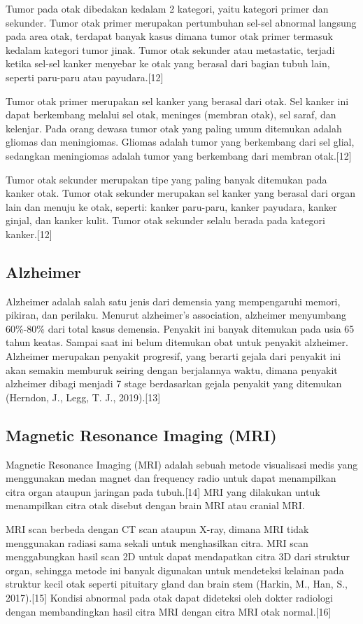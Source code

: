 Tumor pada otak dibedakan kedalam 2 kategori, yaitu kategori primer dan sekunder. Tumor otak primer merupakan pertumbuhan sel-sel abnormal langsung pada area otak, terdapat banyak kasus dimana tumor otak primer termasuk kedalam kategori tumor jinak. Tumor otak sekunder atau metastatic, terjadi ketika sel-sel kanker menyebar ke otak yang berasal dari bagian tubuh lain, seperti paru-paru atau payudara.[12]

Tumor otak primer merupakan sel kanker yang berasal dari otak. Sel kanker ini dapat berkembang melalui sel otak, meninges (membran otak), sel saraf, dan kelenjar. Pada orang dewasa tumor otak yang paling umum ditemukan adalah gliomas dan meningiomas. Gliomas adalah tumor yang berkembang dari sel glial, sedangkan meningiomas adalah tumor yang berkembang dari membran otak.[12]

Tumor otak sekunder merupakan tipe yang paling banyak ditemukan pada kanker otak. Tumor otak sekunder merupakan sel kanker yang berasal dari organ lain dan menuju ke otak, seperti: kanker paru-paru, kanker payudara, kanker ginjal, dan kanker kulit. Tumor otak sekunder selalu berada pada kategori kanker.[12]

\subsection{Alzheimer}
Alzheimer adalah salah satu jenis dari demensia yang mempengaruhi memori, pikiran, dan perilaku. Menurut alzheimer’s association, alzheimer menyumbang 60\%-80\% dari total kasus demensia. Penyakit ini banyak ditemukan pada usia 65 tahun keatas. Sampai saat ini belum ditemukan obat untuk penyakit alzheimer. Alzheimer merupakan penyakit progresif, yang berarti gejala dari penyakit ini akan semakin memburuk seiring dengan berjalannya waktu, dimana penyakit alzheimer dibagi menjadi 7 stage berdasarkan gejala penyakit yang ditemukan (Herndon, J., Legg, T. J., 2019).[13]

\subsection{Magnetic Resonance Imaging (MRI)}
Magnetic Resonance Imaging (MRI) adalah sebuah metode visualisasi medis yang menggunakan medan magnet dan frequency radio untuk dapat menampilkan citra organ ataupun jaringan pada tubuh.[14] MRI yang dilakukan untuk menampilkan citra otak disebut dengan brain MRI atau cranial MRI.

MRI scan berbeda dengan CT scan ataupun X-ray, dimana MRI tidak menggunakan radiasi sama sekali untuk menghasilkan citra. MRI scan menggabungkan hasil scan 2D untuk dapat mendapatkan citra 3D dari struktur organ, sehingga metode ini banyak digunakan untuk mendeteksi kelainan pada struktur kecil otak seperti pituitary gland dan brain stem (Harkin, M., Han, S., 2017).[15] Kondisi abnormal pada otak dapat dideteksi oleh dokter radiologi dengan membandingkan hasil citra MRI dengan citra MRI otak normal.[16]

